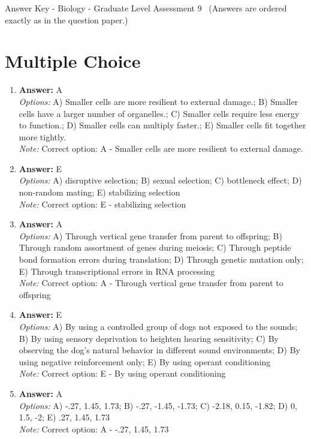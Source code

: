 \documentclass[12pt]{article}
\begin{document}
\begin{center}
Answer Key - Biology - Graduate Level Assessment 9 \
\small (Answers are ordered exactly as in the question paper.)
\end{center}

\section*{Multiple Choice}
\begin{enumerate}[label=\arabic*.]
\item \textbf{Answer:} A
\\ \textit{Options:} A) Smaller cells are more resilient to external damage.; B) Smaller cells have a larger number of organelles.; C) Smaller cells require less energy to function.; D) Smaller cells can multiply faster.; E) Smaller cells fit together more tightly.
\\ \textit{Note:} Correct option: A - Smaller cells are more resilient to external damage.
\item \textbf{Answer:} E
\\ \textit{Options:} A) disruptive selection; B) sexual selection; C) bottleneck effect; D) non-random mating; E) stabilizing selection
\\ \textit{Note:} Correct option: E - stabilizing selection
\item \textbf{Answer:} A
\\ \textit{Options:} A) Through vertical gene transfer from parent to offspring; B) Through random assortment of genes during meiosis; C) Through peptide bond formation errors during translation; D) Through genetic mutation only; E) Through transcriptional errors in RNA processing
\\ \textit{Note:} Correct option: A - Through vertical gene transfer from parent to offspring
\item \textbf{Answer:} E
\\ \textit{Options:} A) By using a controlled group of dogs not exposed to the sounds; B) By using sensory deprivation to heighten hearing sensitivity; C) By observing the dog's natural behavior in different sound environments; D) By using negative reinforcement only; E) By using operant conditioning
\\ \textit{Note:} Correct option: E - By using operant conditioning
\item \textbf{Answer:} A
\\ \textit{Options:} A) -.27, 1.45, 1.73; B) -.27, -1.45, -1.73; C) -2.18, 0.15, -1.82; D) 0, 1.5, -2; E) .27, 1.45, 1.73
\\ \textit{Note:} Correct option: A - -.27, 1.45, 1.73
\end{enumerate}
\end{document}
